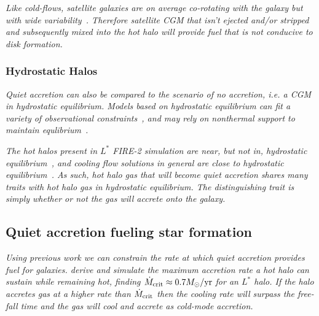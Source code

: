 \documentclass[fleqn,usenatbib]{mnras}
\begin{document}
\textit{
Like cold-flows, satellite galaxies are on average co-rotating with the galaxy but with wide variability~\citep[e.g.][]{Stewart2011, Hafen2019}.
Therefore satellite CGM that isn't ejected and/or stripped and subsequently mixed into the hot halo will provide fuel that is not conducive to disk formation.
}

\subsubsection{Hydrostatic Halos}

\textit{
Quiet accretion can also be compared to the scenario of no accretion, i.e. a CGM in hydrostatic equilibrium.
Models based on hydrostatic equilibrium can fit a variety of observational constraints~\citep[e.g.][]{Faerman2017, Krause2019}, and may rely on nonthermal support to maintain equlibrium~\citep[e.g.][]{Faerman2019}.
}

\textit{
The hot halos present in $L^*$ FIRE-2 simulation are near, but not in, hydrostatic equilibrium~\citep{Esmerian2020, Stern2020}, and cooling flow solutions in general are close to hydrostatic equilibrium~\citep{Stern2019}.
As such, hot halo gas that will become quiet accretion shares many traits with hot halo gas in hydrostatic equilibrium.
The distinguishing trait is simply whether or not the gas will accrete onto the galaxy.
}

\subsection{Quiet accretion fueling star formation}
\label{s: fueling}

\textit{
Using previous work we can constrain the rate at which quiet accretion provides fuel for galaxies.
\cite{Stern2020a} derive and simulate the maximum accretion rate a hot halo can sustain while remaining hot, finding $\dot M_{\rm crit} \approx 0.7 M_\odot/{\rm yr}$ for an $L^*$ halo.
If the halo accretes gas at a higher rate than $\dot M_{\rm crit}$ then the cooling rate will surpass the free-fall time and the gas will cool and accrete as cold-mode accretion.
}
\end{document}
